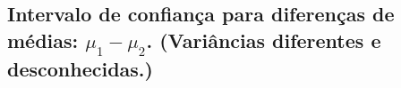 \documentclass[9pt]{beamer}
\begin{document}
%
%	
%	
%
%
%
%

\subsection{Intervalo de confiança para diferenças de médias: $\mu_1 - \mu_2$. (Variâncias diferentes e desconhecidas.)}
\end{document}
